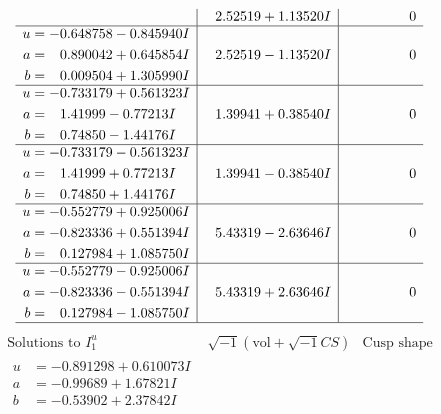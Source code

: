 \documentclass[1p]{elsarticle_modified}
\theoremstyle{definition}
\newcommand{\I}{\sqrt{-1}}
\begin{document}
$$\begin{array}{c|c|c}
 & \phantom{-}2.52519 + 1.13520 I & \phantom{-0.000000 } 0 \\ \hline\begin{aligned}
u &= -0.648758 - 0.845940 I \\
a &= \phantom{-}0.890042 + 0.645854 I \\
b &= \phantom{-}0.009504 + 1.305990 I\end{aligned}
 & \phantom{-}2.52519 - 1.13520 I & \phantom{-0.000000 } 0 \\ \hline\begin{aligned}
u &= -0.733179 + 0.561323 I \\
a &= \phantom{-}1.41999 - 0.77213 I \\
b &= \phantom{-}0.74850 - 1.44176 I\end{aligned}
 & \phantom{-}1.39941 + 0.38540 I & \phantom{-0.000000 } 0 \\ \hline\begin{aligned}
u &= -0.733179 - 0.561323 I \\
a &= \phantom{-}1.41999 + 0.77213 I \\
b &= \phantom{-}0.74850 + 1.44176 I\end{aligned}
 & \phantom{-}1.39941 - 0.38540 I & \phantom{-0.000000 } 0 \\ \hline\begin{aligned}
u &= -0.552779 + 0.925006 I \\
a &= -0.823336 + 0.551394 I \\
b &= \phantom{-}0.127984 + 1.085750 I\end{aligned}
 & \phantom{-}5.43319 - 2.63646 I & \phantom{-0.000000 } 0 \\ \hline\begin{aligned}
u &= -0.552779 - 0.925006 I \\
a &= -0.823336 - 0.551394 I \\
b &= \phantom{-}0.127984 - 1.085750 I\end{aligned}
 & \phantom{-}5.43319 + 2.63646 I & \phantom{-0.000000 } 0\\
 \hline 
 \end{array}$$\newpage$$\begin{array}{c|c|c}  
\text{Solutions to }I^u_{1}& \I (\text{vol} + \sqrt{-1}CS) & \text{Cusp shape}\\
 \hline 
\begin{aligned}
u &= -0.891298 + 0.610073 I \\
a &= -0.99689 + 1.67821 I \\
b &= -0.53902 + 2.37842 I\end{aligned}

\end{array}$$
\end{document}
